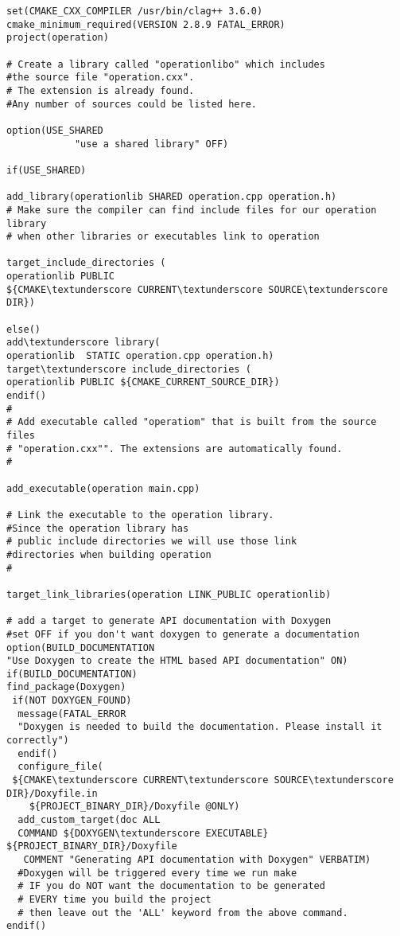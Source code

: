 \documentclass[11pt,utf8]{article}
\begin{document}
\begin{lstlisting}
set(CMAKE_CXX_COMPILER /usr/bin/clag++ 3.6.0)
cmake_minimum_required(VERSION 2.8.9 FATAL_ERROR)
project(operation)

# Create a library called "operationlibo" which includes 
#the source file "operation.cxx".
# The extension is already found. 
#Any number of sources could be listed here.

option(USE_SHARED 
            "use a shared library" OFF)

if(USE_SHARED)

add_library(operationlib SHARED operation.cpp operation.h)  
# Make sure the compiler can find include files for our operation library
# when other libraries or executables link to operation

target_include_directories (
operationlib PUBLIC 
${CMAKE\textunderscore CURRENT\textunderscore SOURCE\textunderscore DIR})

else()
add\textunderscore library(
operationlib  STATIC operation.cpp operation.h)
target\textunderscore include_directories (
operationlib PUBLIC ${CMAKE_CURRENT_SOURCE_DIR})
endif()
# 
# Add executable called "operatiom" that is built from the source files
# "operation.cxx"". The extensions are automatically found.
#

add_executable(operation main.cpp)

# Link the executable to the operation library. 
#Since the operation library has
# public include directories we will use those link 
#directories when building operation
#

target_link_libraries(operation LINK_PUBLIC operationlib)

# add a target to generate API documentation with Doxygen
#set OFF if you don't want doxygen to generate a documentation
option(BUILD_DOCUMENTATION 
"Use Doxygen to create the HTML based API documentation" ON)
if(BUILD_DOCUMENTATION)
find_package(Doxygen)
 if(NOT DOXYGEN_FOUND)
  message(FATAL_ERROR
  "Doxygen is needed to build the documentation. Please install it correctly")
  endif()
  configure_file(
 ${CMAKE\textunderscore CURRENT\textunderscore SOURCE\textunderscore DIR}/Doxyfile.in 
    ${PROJECT_BINARY_DIR}/Doxyfile @ONLY)
  add_custom_target(doc ALL
  COMMAND ${DOXYGEN\textunderscore EXECUTABLE} ${PROJECT_BINARY_DIR}/Doxyfile
   COMMENT "Generating API documentation with Doxygen" VERBATIM)
  #Doxygen will be triggered every time we run make
  # IF you do NOT want the documentation to be generated
  # EVERY time you build the project
  # then leave out the 'ALL' keyword from the above command.                
endif()
\end{lstlisting}
\end{document}
